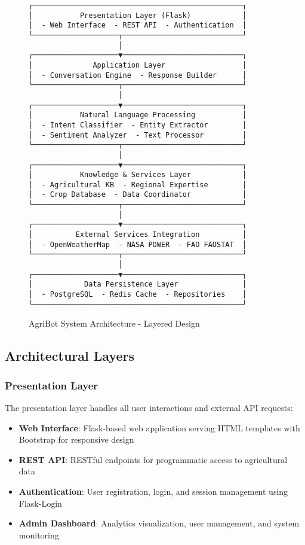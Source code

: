 \documentclass[12pt,a4paper]{article}
\begin{document}
\begin{figure}[h]
\centering
\begin{verbatim}
┌─────────────────────────────────────────────────┐
│           Presentation Layer (Flask)            │
│  - Web Interface  - REST API  - Authentication  │
└────────────────────┬────────────────────────────┘
                     │
┌────────────────────▼────────────────────────────┐
│              Application Layer                  │
│  - Conversation Engine  - Response Builder      │
└────────────────────┬────────────────────────────┘
                     │
┌────────────────────▼────────────────────────────┐
│           Natural Language Processing           │
│  - Intent Classifier  - Entity Extractor        │
│  - Sentiment Analyzer  - Text Processor         │
└────────────────────┬────────────────────────────┘
                     │
┌────────────────────▼────────────────────────────┐
│           Knowledge & Services Layer            │
│  - Agricultural KB  - Regional Expertise        │
│  - Crop Database  - Data Coordinator            │
└────────────────────┬────────────────────────────┘
                     │
┌────────────────────▼────────────────────────────┐
│          External Services Integration          │
│  - OpenWeatherMap  - NASA POWER  - FAO FAOSTAT  │
└────────────────────┬────────────────────────────┘
                     │
┌────────────────────▼────────────────────────────┐
│            Data Persistence Layer               │
│  - PostgreSQL  - Redis Cache  - Repositories    │
└─────────────────────────────────────────────────┘
\end{verbatim}
\caption{AgriBot System Architecture - Layered Design}
\label{fig:architecture}
\end{figure}

\subsection{Architectural Layers}

\subsubsection{Presentation Layer}

The presentation layer handles all user interactions and external API requests:

\begin{itemize}[leftmargin=*]
    \item \textbf{Web Interface}: Flask-based web application serving HTML templates with Bootstrap for responsive design
    \item \textbf{REST API}: RESTful endpoints for programmatic access to agricultural data
    \item \textbf{Authentication}: User registration, login, and session management using Flask-Login
    \item \textbf{Admin Dashboard}: Analytics visualization, user management, and system monitoring
\end{itemize}
\end{document}

